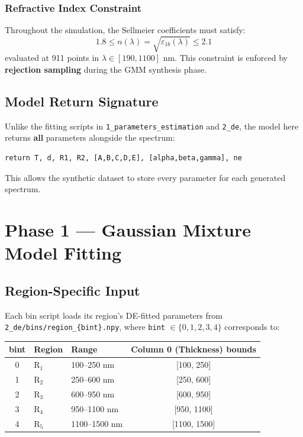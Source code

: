 \documentclass[11pt,a4paper]{article}
\begin{document}
\subsubsection*{Refractive Index Constraint}
Throughout the simulation, the Sellmeier coefficients must satisfy:
\begin{equation*}
    1.8 \leq n(\lambda) = \sqrt{\varepsilon_{1b}(\lambda)} \leq 2.1
\end{equation*}
evaluated at 911 points in $\lambda \in [190, 1100]$ nm. This constraint is enforced by \textbf{rejection sampling} during the GMM synthesis phase.

\subsection{Model Return Signature}

Unlike the fitting scripts in {\tt 1\_parameters\_estimation} and {\tt 2\_de}, the model here returns \textbf{all} parameters alongside the spectrum:
\begin{lstlisting}
return T, d, R1, R2, [A,B,C,D,E], [alpha,beta,gamma], ne
\end{lstlisting}
This allows the synthetic dataset to store every parameter for each generated spectrum.

\section{Phase 1 — Gaussian Mixture Model Fitting}

\subsection{Region-Specific Input}

Each bin script loads its region's DE-fitted parameters from {\tt 2\_de/bins/region\_\{bint\}.npy}, where {\tt bint} $\in \{0, 1, 2, 3, 4\}$ corresponds to:

\begin{table}[htbp]
\centering
\begin{tabular}{cllc}
\toprule
\textbf{bint} & \textbf{Region} & \textbf{Range} & \textbf{Column 0 (Thickness) bounds} \\
\midrule
0 & R$_1$ & 100--250 nm  & [100, 250] \\
1 & R$_2$ & 250--600 nm  & [250, 600] \\
2 & R$_3$ & 600--950 nm  & [600, 950] \\
3 & R$_4$ & 950--1100 nm & [950, 1100] \\
4 & R$_5$ & 1100--1500 nm & [1100, 1500] \\
\bottomrule
\end{tabular}
\end{table}
\end{document}
